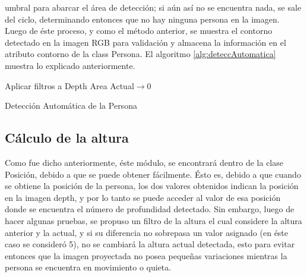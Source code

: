 \documentclass[a4paper,openright,12pt]{report}
\begin{document}
umbral para abarcar el área de detección; si aún así no se encuentra nada, se sale del ciclo, determinando entonces que no hay ninguna persona en la imagen.\\
Luego de éste proceso, y como el método anterior, se muestra el contorno detectado en la imagen RGB para validación y almacena la información en el atributo contorno de la class Persona. El algoritmo \ref{alg:deteccAutomatica} muestra lo explicado anteriormente.
\begin{algorithm}[p]
	\SetAlgoLined
	Aplicar filtros a Depth\;
	Area Actual$\rightarrow$0\;
	
	\caption{Detección Automática de la Persona}
	\label{alg:deteccAutomatica}
\end{algorithm}
\subsection{Cálculo de la altura}
Como fue dicho anteriormente, éste módulo, se encontrará dentro de la clase Posición, debido a que se puede obtener fácilmente. Ésto es, debido a que cuando se obtiene la posición de la persona, los dos valores obtenidos indican la posición en la imagen depth, y por lo tanto se puede acceder al valor de esa posición donde se encuentra el número de profundidad detectado. Sin embargo, luego de hacer algunas pruebas, se propuso un filtro de la altura el cual considere la altura anterior y la actual, y si su diferencia no sobrepasa un valor asignado (en éste caso se consideró 5), no se cambiará la altura actual detectada, esto para evitar entonces que la imagen proyectada no posea pequeñas variaciones mientras la persona se encuentra en movimiento o quieta.
\end{document}
